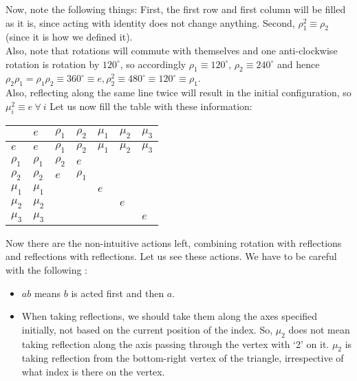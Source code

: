 \noindent
Now, note the following things: First, the first row and first column will be filled as it is, since acting with identity does not change anything. Second, $\rho_1^2 \equiv \rho_2$ (since it is how we defined it).\\[0.2cm] Also, note that rotations will commute with themselves and one anti-clockwise rotation is rotation by $120^\circ$, so accordingly $\rho_1 \equiv 120^\circ$, $\rho_2\equiv 240^\circ$ and hence $\rho_2\rho_1 = \rho_1\rho_2 \equiv 360^\circ \equiv e, \rho_2^2 \equiv 480^\circ \equiv 120^\circ \equiv \rho_1$.\\[0.2cm]
Also, reflecting along the same line twice will result in the initial configuration, so $\mu_i^2 \equiv e \ \forall \ i $ Let us now fill the table with these information:

\begin{table}[H]
\centering
\renewcommand{\arraystretch}{1.6} %
\begin{tabular}{|
    >{\centering\arraybackslash}p{}|
    >{\centering\arraybackslash}p{}|
    >{\centering\arraybackslash}p{}|
    >{\centering\arraybackslash}p{}|
    >{\centering\arraybackslash}p{}|
    >{\centering\arraybackslash}p{}|
    >{\centering\arraybackslash}p{}|
    }
\hline
\text{\Large $*$} & $e$ & $\rho_1$ & $\rho_2$ & $\mu_1$ & $\mu_2$ & $\mu_3$ \\
\hline
$e $   &  $e$ & $\rho_1$ & $\rho_2$ & $\mu_1$ & $\mu_2$ & $\mu_3$   \\
\hline
$\rho_1$ & $\rho_1$   &  $\rho_2$  &  $e$ &   &   &   \\
\hline
$\rho_2$ &  $\rho_2$  & $e$  &   $\rho_1$ &   &   &   \\
\hline
$\mu_1$  & $\mu_1$   &   &   &$e$   &   &   \\
\hline
$\mu_2$  & $\mu_2$  &   &   &   & $e$  &   \\
\hline
$\mu_3$  &  $\mu_3$ &   &   &   &   &  $e$ \\
\hline
\end{tabular}
\end{table}
\noindent
Now there are the non-intuitive actions left, combining rotation with reflections and reflections with reflections. Let us see these actions. We have to be careful with the following :
\begin{itemize}
    \item $ab$ means $b$ is acted first and then $a$. 
    \item When taking reflections, we should take them along the axes specified initially, not based on the current position of the index. So, $\mu_2$ does not mean taking reflection along the axis passing through the vertex with `2' on it. $\mu_2$ is taking reflection from the bottom-right vertex of the triangle, irrespective of what index is there on the vertex. 
\end{itemize}

